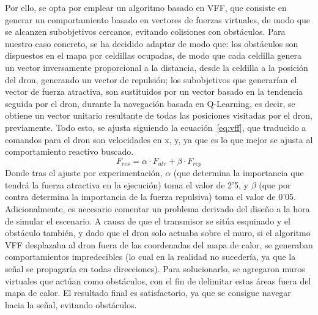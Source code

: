 Por ello, se opta por emplear un algoritmo basado en \ac{VFF}, que consiste en generar un comportamiento basado en vectores de fuerzas virtuales, de modo que se alcanzen subobjetivos cercanos, evitando colisiones con obstáculos. Para nuestro caso concreto, se ha decidido adaptar de modo que: los obstáculos son dispuestos en el mapa por celdillas ocupadas, de modo que cada celdilla genera un vector inversamente proporcional a la distancia, desde la celdilla a la posición del dron, generando un vector de repulsión; los subobjetivos que generarían el vector de fuerza atractiva, son sustituidos por un vector basado en la tendencia seguida por el dron, durante la navegación basada en Q-Learning, es decir, se obtiene un vector unitario resultante de todas las posiciones visitadas por el dron, previamente. Todo esto, se ajusta siguiendo la ecuación~\ref{eq:vff}, que traducido a comandos para el dron son velocidades en x, y, ya que es lo que mejor se ajusta al comportamiento reactivo buscado.
\begin{equation}
    F_{res} = \alpha \cdot F_{atr} + \beta \cdot F_{rep}
    \label{eq:vff}
\end{equation}
Donde tras el ajuste por experimentación, $\alpha$ (que determina la importancia que tendrá la fuerza atractiva en la ejecución) toma el valor de 2'5, y $\beta$ (que por contra determina la importancia de la fuerza repulsiva) toma el valor de 0'05. Adicionalmente, es necesario comentar un problema derivado del diseño a la hora de simular el escenario. A causa de que el transmisor se sitúa esquinado y el obstáculo también, y dado que el dron solo actuaba sobre el muro, si el algoritmo \ac{VFF} desplazaba al dron fuera de las coordenadas del mapa de calor, se generaban comportamientos impredecibles (lo cual en la realidad no sucedería, ya que la señal se propagaría en todas direcciones). Para solucionarlo, se agregaron muros virtuales que actúan como obstáculos, con el fin de delimitar estas áreas fuera del mapa de calor. El resultado final es satisfactorio, ya que se consigue navegar hacia la señal, evitando obstáculos.
